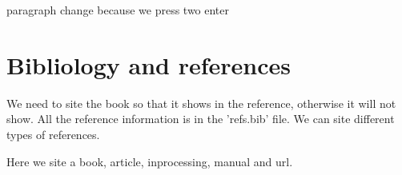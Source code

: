 \documentclass[12pt, A4]{article} %
\begin{document}
paragraph change because we press two enter

\section{Bibliology and references}

We need to site the book\cite{latex2e} so that it shows in the reference, otherwise it will not show. All the reference information is in the 'refs.bib' file. We can site different types of references.

Here we site a book\cite{texbook},  article\cite{knuth:1984}, inprocessing\cite{lesk:1977}, manual\cite{evita:user} and url\cite{wiki:minV}.
\end{document}
